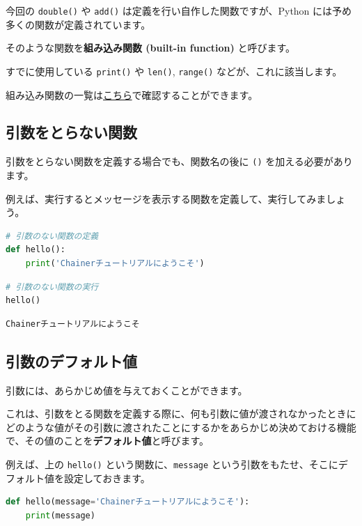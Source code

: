 今回の \texttt{double()} や \texttt{add()} は定義を行い自作した関数ですが、Python には予め多くの関数が定義されています。

そのような関数を\textbf{組み込み関数 (built-in function)} と呼びます。

すでに使用している \texttt{print()} や \texttt{len()}, \texttt{range()} などが、これに該当します。

組み込み関数の一覧は\href{https://docs.python.org/ja/3/library/functions.html}{こちら}で確認することができます。


\subsection{引数をとらない関数}


引数をとらない関数を定義する場合でも、関数名の後に \texttt{()} を加える必要があります。


例えば、実行するとメッセージを表示する関数を定義して、実行してみましょう。


\begin{lstlisting}[style=codecell,language=Python]
# 引数のない関数の定義
def hello():
    print('Chainerチュートリアルにようこそ')
\end{lstlisting}

\begin{lstlisting}[style=codecell,language=Python]
# 引数のない関数の実行
hello()
\end{lstlisting}

\begin{lstlisting}[style=outputcell]
Chainerチュートリアルにようこそ
\end{lstlisting}

\subsection{引数のデフォルト値}


引数には、あらかじめ値を与えておくことができます。

これは、引数をとる関数を定義する際に、何も引数に値が渡されなかったときにどのような値がその引数に渡されたことにするかをあらかじめ決めておける機能で、その値のことを\textbf{デフォルト値}と呼びます。


例えば、上の \texttt{hello()} という関数に、\texttt{message} という引数をもたせ、そこにデフォルト値を設定しておきます。


\begin{lstlisting}[style=codecell,language=Python]
def hello(message='Chainerチュートリアルにようこそ'):
    print(message)
\end{lstlisting}

